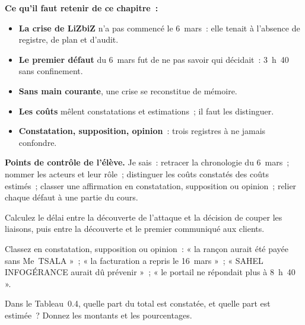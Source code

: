 \separateur

\begin{boxresume}
\textbf{Ce qu'il faut retenir de ce chapitre~:}
\begin{itemize}
    \item \textbf{La crise de LiZbiZ} n'a pas commencé le 6~mars~: elle
          tenait à l'absence de registre, de plan et d'audit.
    \item \textbf{Le premier défaut} du 6~mars fut de ne pas savoir qui
          décidait~: 3~h~40 sans confinement.
    \item \textbf{Sans main courante}, une crise se reconstitue de mémoire.
    \item \textbf{Les coûts} mêlent constatations et estimations~; il faut
          les distinguer.
    \item \textbf{Constatation, supposition, opinion}~: trois registres à
          ne jamais confondre.
\end{itemize}
\end{boxresume}

\begin{boxinfo}
\textbf{Points de contrôle de l'élève.} Je sais~: retracer la chronologie
du 6~mars~; nommer les acteurs et leur rôle~; distinguer les coûts
constatés des coûts estimés~; classer une affirmation en constatation,
supposition ou opinion~; relier chaque défaut à une partie du cours.
\end{boxinfo}

\bigskip

\begin{boxexo}[title={\ding{45}\quad Exercice~0.1. Le délai \niveaubase}]
Calculez le délai entre la découverte de l'attaque et la décision de
couper les liaisons, puis entre la découverte et le premier communiqué aux
clients.
\end{boxexo}

\begin{boxexo}[title={\ding{45}\quad Exercice~0.2. Les registres \niveaubase}]
Classez en constatation, supposition ou opinion~: « la rançon aurait été
payée sans Me~TSALA »~; « la facturation a repris le 16~mars »~; « SAHEL
INFOGÉRANCE aurait dû prévenir »~; « le portail ne répondait plus à
8~h~40 ».
\end{boxexo}

\begin{boxexo}[title={\ding{45}\quad Exercice~0.3. Les coûts \niveaubase}]
Dans le Tableau~0.4, quelle part du total est constatée, et quelle part
est estimée~? Donnez les montants et les pourcentages.
\end{boxexo}

